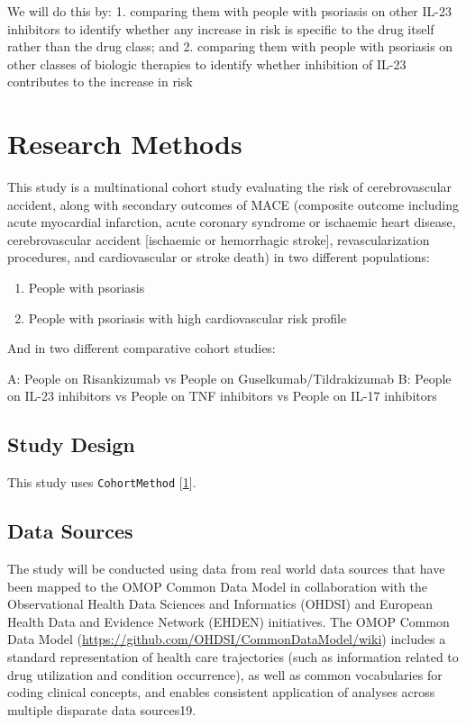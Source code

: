 \documentclass[
  12pt,
]{article}
\providecommand{\tightlist}{%
  \setlength{\itemsep}{0pt}\setlength{\parskip}{0pt}}
\begin{document}
We will do this by:
1. comparing them with people with psoriasis on other IL-23 inhibitors to identify whether any increase in risk is specific to the drug itself rather than the drug class; and
2. comparing them with people with psoriasis on other classes of biologic therapies to identify whether inhibition of IL-23 contributes to the increase in risk

\hypertarget{research-methods}{%
\section{Research Methods}\label{research-methods}}

This study is a multinational cohort study evaluating the risk of cerebrovascular accident, along with secondary outcomes of MACE (composite outcome including acute myocardial infarction, acute coronary syndrome or ischaemic heart disease, cerebrovascular accident {[}ischaemic or hemorrhagic stroke{]}, revascularization procedures, and cardiovascular or stroke death) in two different populations:

\begin{enumerate}
\def\labelenumi{\Alph{enumi}.}
\tightlist
\item
  People with psoriasis
\item
  People with psoriasis with high cardiovascular risk profile
\end{enumerate}

And in two different comparative cohort studies:

A: People on Risankizumab vs People on Guselkumab/Tildrakizumab
B: People on IL-23 inhibitors vs People on TNF inhibitors vs People on IL-17 inhibitors

\hypertarget{study-design}{%
\subsection{Study Design}\label{study-design}}

This study uses \texttt{CohortMethod} {[}\protect\hyperlink{ref-Schuemie2020-fa}{1}{]}.

\hypertarget{data-sources}{%
\subsection{Data Sources}\label{data-sources}}

The study will be conducted using data from real world data sources that have been mapped to the OMOP Common Data Model in collaboration with the Observational Health Data Sciences and Informatics (OHDSI) and European Health Data and Evidence Network (EHDEN) initiatives. The OMOP Common Data Model (\url{https://github.com/OHDSI/CommonDataModel/wiki}) includes a standard representation of health care trajectories (such as information related to drug utilization and condition occurrence), as well as common vocabularies for coding clinical concepts, and enables consistent application of analyses across multiple disparate data sources19.
\end{document}
